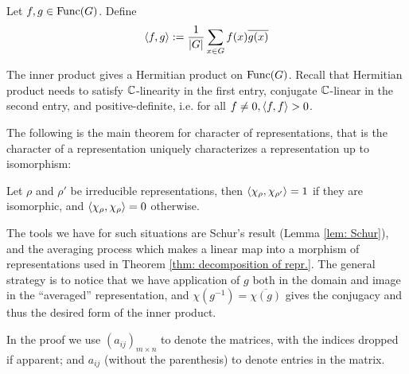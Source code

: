 \documentclass{article}
\begin{document}
\begin{definition}
    Let $f, g \in \mathrm{Func}(G)$. Define 
    \[
        \left\langle f, g \right\rangle := \frac{1}{\left|G\right|} \sum_{x \in G} f(x) \overline{g(x)}
    \]
\end{definition}

\begin{remark}
    The inner product gives a Hermitian product on $\mathrm{Func}(G)$. Recall that Hermitian product needs to satisfy $\mathbb{C}$-linearity in the first entry, conjugate $\mathbb{C}$-linear in the second entry, and positive-definite, i.e. for all $f \neq 0, \left\langle f, f \right\rangle > 0$.
\end{remark}

\textstart
The following is the main theorem for character of representations, that is the character of a representation uniquely characterizes a representation up to isomorphism:

\begin{theorem}\label{thm: inner product of irred repr.}
    Let $\rho$ and $\rho'$ be irreducible representations, then $\left\langle \chi_{\rho}, \chi_{\rho'} \right\rangle = 1$ if they are isomorphic, and $\left\langle \chi_{\rho}, \chi_{\rho} \right\rangle = 0$ otherwise.
\end{theorem}

\textstart
The tools we have for such situations are Schur's result (Lemma \ref{lem: Schur}), and the averaging process which makes a linear map into a morphism of representations used in Theorem \ref{thm: decomposition of repr.}. The general strategy is to notice that we have application of $g$ both in the domain and image in the ``averaged'' representation, and $\chi(g^{-1}) = \overline{\chi(g)}$ gives the conjugacy and thus the desired form of the inner product.

\begin{notation}
    In the proof we use $(a_{ij})_{m \times n}$ to denote the matrices, with the indices dropped if apparent; and $a_{ij}$ (without the parenthesis) to denote entries in the matrix. 
\end{notation}
\end{document}
